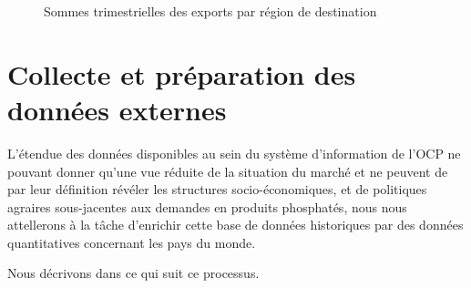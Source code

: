 				\begin{figure}[H]
				\centering
				\caption{Sommes trimestrielles des exports par région de destination}
				\label{fig:compReg}
				\end{figure}

	\section{Collecte et préparation des données externes}
	L'étendue des données disponibles au sein du système d'information de l'OCP ne pouvant donner qu'une vue réduite de la situation du marché et ne peuvent de par leur définition révéler les structures socio-économiques,  et de politiques agraires sous-jacentes aux demandes en produits phosphatés, nous nous attellerons à la tâche d'enrichir cette base de données historiques par des données quantitatives concernant les pays du monde.
	\par
	Nous décrivons dans ce qui suit ce processus. 
